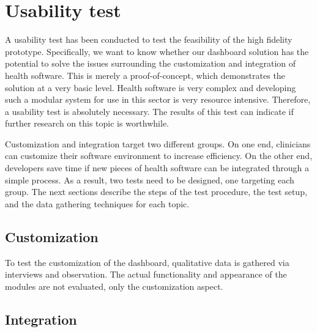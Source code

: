 \section{Usability test} \label{usabilitytest}
	
A usability test has been conducted to test the feasibility of the high fidelity prototype. Specifically, we want to know whether our dashboard solution has the potential to solve the issues surrounding the customization and integration of health software. This is merely a proof-of-concept, which demonstrates the solution at a very basic level. Health software is very complex and developing such a modular system for use in this sector is very resource intensive. Therefore, a usability test is absolutely necessary. The results of this test can indicate if further research on this topic is worthwhile. 

Customization and integration target two different groups. On one end, clinicians can customize their software environment to increase efficiency. On the other end, developers save time if new pieces of health software can be integrated through a simple process. As a result, two tests need to be designed, one targeting each group. The next sections describe the steps of the test procedure, the test setup, and the data gathering techniques for each topic.

    \subsection{Customization}

    
    To test the customization of the dashboard, qualitative data is gathered via interviews and observation. The actual functionality and appearance of the modules are not evaluated, only the customization aspect.


    \subsection{Integration}

    